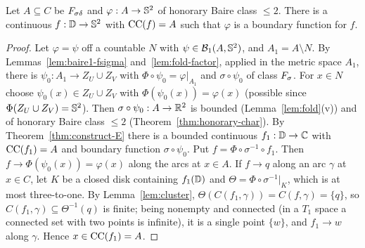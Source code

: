 \begin{theorem}\label{thm:construct-F}
Let $A\subseteq C$ be $F_{\sigma\delta}$ and $\varphi:A\to\mathbb{S}^2$ of honorary Baire class $\le2$. There is a continuous $f:\mathbb{D}\to\mathbb{S}^2$ with
$\operatorname{CC}(f)=A$ such that $\varphi$ is a boundary function for $f$.
\end{theorem}
\begin{proof}
Let $\varphi=\psi$ off a countable $N$ with $\psi\in\mathcal B_1(A,\mathbb{S}^2)$, and $A_1=A\setminus N$. By
Lemmas~\ref{lem:baire1-fsigma} and~\ref{lem:fold-factor}, applied in the metric space $A_1$, there is $\psi_0:A_1\to Z_U\cup Z_V$ with
$\Phi\circ\psi_0=\varphi|_{A_1}$ and $\sigma\circ\psi_0$ of class $F_\sigma$. For $x\in N$ choose $\psi_0(x)\in Z_U\cup Z_V$ with
$\Phi(\psi_0(x))=\varphi(x)$ (possible since $\Phi(Z_U\cup Z_V)=\mathbb{S}^2$). Then $\sigma\circ\psi_0:A\to\mathbb{R}^2$ is bounded
(Lemma~\ref{lem:fold}(v)) and of honorary Baire class $\le2$ (Theorem~\ref{thm:honorary-char}). By
Theorem~\ref{thm:construct-E} there is a bounded continuous $f_1:\mathbb{D}\to\mathbb{C}$ with $\operatorname{CC}(f_1)=A$ and boundary function
$\sigma\circ\psi_0$. Put $f=\Phi\circ\sigma^{-1}\circ f_1$. Then $f\to\Phi(\psi_0(x))=\varphi(x)$ along the arcs at $x\in A$. If
$f\to q$ along an arc $\gamma$ at $x\in C$, let $K$ be a closed disk containing $f_1(\mathbb{D})$ and $\Theta=\Phi\circ\sigma^{-1}|_K$, which
is at most three-to-one. By Lemma~\ref{lem:cluster}, $\Theta(C(f_1,\gamma))=C(f,\gamma)=\{q\}$, so $C(f_1,\gamma)\subseteq\Theta^{-1}(q)$
is finite; being nonempty and connected (in a $T_1$ space a connected set with two points is infinite), it is a single point
$\{w\}$, and $f_1\to w$ along $\gamma$. Hence $x\in\operatorname{CC}(f_1)=A$.
\end{proof}

